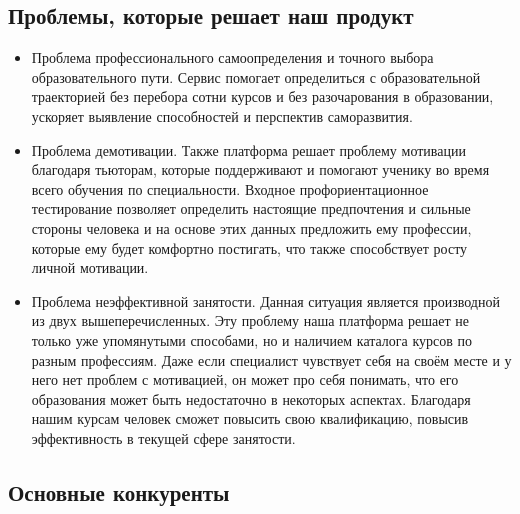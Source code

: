 \documentclass[12pt]{article}
\begin{document}
\subsection{Проблемы, которые решает наш продукт}
\begin{itemize}
    \item Проблема профессионального самоопределения и точного выбора образовательного пути. Сервис помогает определиться с образовательной траекторией без перебора сотни курсов и без разочарования в образовании, ускоряет выявление способностей и перспектив саморазвития.
    \item Проблема демотивации. Также платформа решает проблему мотивации благодаря тьюторам, которые поддерживают и помогают ученику во время всего обучения по специальности. Входное профориентационное тестирование позволяет определить настоящие предпочтения и сильные стороны человека и на основе этих данных предложить ему профессии, которые ему будет комфортно постигать, что также способствует росту личной мотивации.
    \item Проблема неэффективной занятости. Данная ситуация является производной из двух вышеперечисленных. Эту проблему наша платформа решает не только уже упомянутыми способами, но и наличием каталога курсов по разным профессиям. Даже если специалист чувствует себя на своём месте и у него нет проблем с мотивацией, он может про себя понимать, что его образования может быть недостаточно в некоторых аспектах. Благодаря нашим курсам человек сможет повысить свою квалификацию, повысив эффективность в текущей сфере занятости.
\end{itemize}


\subsection{Основные конкуренты}
\end{document}
